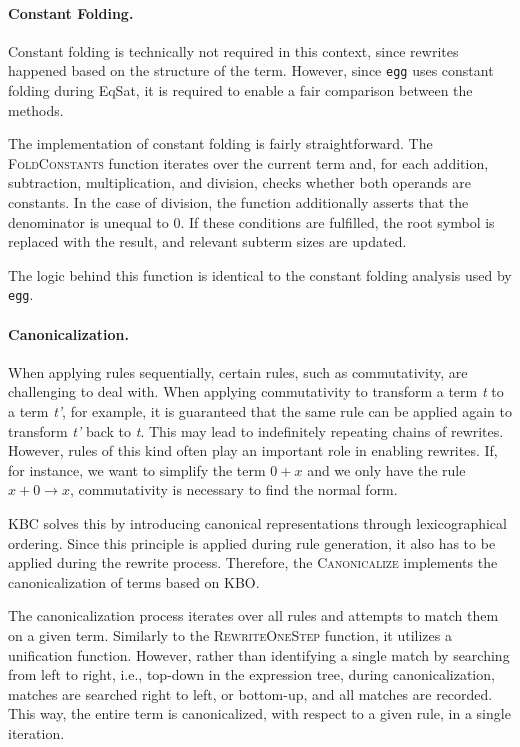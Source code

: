 \paragraph{Constant Folding.} Constant folding is technically not required in this context, since rewrites happened based on the structure of the term. However, since \texttt{egg} uses constant folding during EqSat, it is required to enable a fair comparison between the methods. 

The implementation of constant folding is fairly straightforward. The \textsc{FoldConstants} function iterates over the current term and, for each addition, subtraction, multiplication, and division, checks whether both operands are constants. In the case of division, the function additionally asserts that the denominator is unequal to 0. If these conditions are fulfilled, the root symbol is replaced with the result, and relevant subterm sizes are updated.

The logic behind this function is identical to the constant folding analysis used by \texttt{egg}.

\paragraph{Canonicalization.} When applying rules sequentially, certain rules, such as commutativity, are challenging to deal with. When applying commutativity to transform a term \emph{t} to a term \emph{t'}, for example, it is guaranteed that the same rule can be applied again to transform \emph{t'} back to \emph{t}. This may lead to indefinitely repeating chains of rewrites. However, rules of this kind often play an important role in enabling rewrites. If, for instance, we want to simplify the term $0+x$ and we only have the rule $x+0 \to x$, commutativity is necessary to find the normal form.

KBC solves this by introducing canonical representations through lexicographical ordering. Since this principle is applied during rule generation, it also has to be applied during the rewrite process. Therefore, the \textsc{Canonicalize} implements the canonicalization of terms based on KBO. 

The canonicalization process iterates over all rules and attempts to match them on a given term. Similarly to the \textsc{RewriteOneStep} function, it utilizes a unification function. However, rather than identifying a single match by searching from left to right, i.e., top-down in the expression tree, during canonicalization, matches are searched right to left, or bottom-up, and all matches are recorded. This way, the entire term is canonicalized, with respect to a given rule, in a single iteration.

